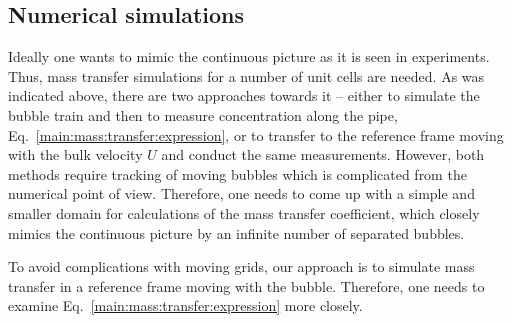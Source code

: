 \documentclass{article}
\begin{document}
\subsection{Numerical simulations}
\label{section:cases}
Ideally one wants to mimic the continuous picture as it is seen in experiments.
Thus, mass transfer simulations for a number of unit cells are needed. As was
indicated above, there are two approaches towards it -- either to simulate the
bubble train and then to measure concentration along the pipe, Eq.~\ref{main:mass:transfer:expression},
or to transfer to the reference frame moving with the bulk
velocity $U$ and conduct the same measurements. However, both methods require tracking of
moving bubbles which is complicated from the numerical point of view. Therefore, one needs to come
up with a simple and smaller domain for calculations of the mass transfer coefficient, which closely mimics the
continuous picture by an infinite number of  separated bubbles. 

To avoid complications with moving grids, our
approach is to simulate mass transfer in a reference frame moving with the bubble. Therefore, one
needs to examine  Eq.~\ref{main:mass:transfer:expression} more closely. 
\end{document}
